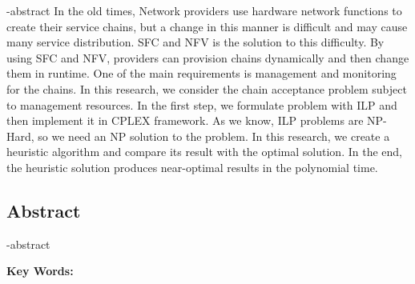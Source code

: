 
\en-abstract{
In the old times, Network providers use hardware network functions to create their service chains, but a change in this manner is difficult and may cause many service distribution. SFC and NFV is the solution to this difficulty. By using SFC and NFV, providers can provision chains dynamically and then change them in runtime. One of the main requirements is management and monitoring for the chains.
In this research, we consider the chain acceptance problem subject to management resources. In the first step, we formulate
problem with ILP and then implement it in CPLEX framework. As we know, ILP problems are NP-Hard, so we need an NP solution to the problem. In this research, we create a heuristic algorithm and compare its result with the optimal solution. In the end, the heuristic solution produces near-optimal results in the polynomial time.
}

\newpage
\thispagestyle{empty}
\begin{latin}
\section*{\LARGE\centering Abstract}

\een-abstract

\vspace*{.5cm}
{\large\textbf{Key Words:}}\par
\vspace*{.5cm}
\elatinkeywords
\end{latin}
